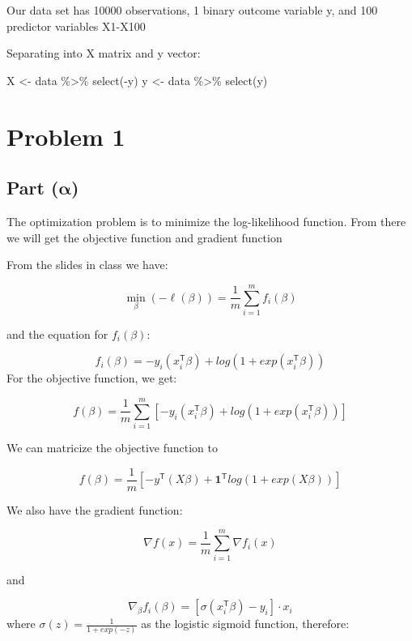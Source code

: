 \documentclass[
  letterpaper,
  DIV=11,
  numbers=noendperiod]{scrartcl}
\newenvironment{Shaded}{\begin{snugshade}}{\end{snugshade}}
\newcommand{\FunctionTok}[1]{\textcolor[rgb]{0.28,0.35,0.67}{#1}}
\newcommand{\NormalTok}[1]{\textcolor[rgb]{0.00,0.23,0.31}{#1}}
\newcommand{\OtherTok}[1]{\textcolor[rgb]{0.00,0.23,0.31}{#1}}
\newcommand{\SpecialCharTok}[1]{\textcolor[rgb]{0.37,0.37,0.37}{#1}}
\begin{document}
Our data set has 10000 observations, 1 binary outcome variable y, and
100 predictor variables X1-X100

Separating into X matrix and y vector:

\begin{Shaded}
\begin{Highlighting}[]
\NormalTok{X }\OtherTok{\textless{}{-}}\NormalTok{ data }\SpecialCharTok{\%\textgreater{}\%}
  \FunctionTok{select}\NormalTok{(}\SpecialCharTok{{-}}\NormalTok{y)}
\NormalTok{y }\OtherTok{\textless{}{-}}\NormalTok{ data }\SpecialCharTok{\%\textgreater{}\%}
  \FunctionTok{select}\NormalTok{(y)}
\end{Highlighting}
\end{Shaded}

\section{Problem 1}\label{problem-1}

\subsection{\texorpdfstring{Part
(\(\symbf{\alpha}\))}{Part (\textbackslash symbf\{\textbackslash alpha\})}}\label{part-symbfalpha}

The optimization problem is to minimize the log-likelihood function.
From there we will get the objective function and gradient function

From the slides in class we have:

\[
\min_{\beta} (-\ell(\beta)) = \frac{1}{m} \sum_{i=1}^{m} f_i(\beta)
\]

and the equation for \(f_i(\beta)\):

\[
f_i(\beta) = -y_i(x_i^{\mathsf{T}}\beta) + log(1 + exp(x_i^{\mathsf{T}} \beta))
\] For the objective function, we get:

\[
f(\beta) = \frac{1}{m} \sum_{i=1}^{m} [-y_i(x_i^{\mathsf{T}}\beta) + log(1 + exp(x_i^{\mathsf{T}} \beta))]
\]

We can matricize the objective function to

\[
\boxed{f(\beta) = \frac{1}{m}[-y^{\mathsf{T}}(X\beta) + \mathbf{1}^{\mathsf{T}}log(1 + exp(X\beta))]}
\]

We also have the gradient function:

\[
\nabla f(x) = \frac{1}{m} \sum_{i=1}^m \nabla f_i(x)
\]

and

\[
\nabla_\beta f_i(\beta) = [\sigma(x_i^{\mathsf{T}} \beta) - y_i] \cdot x_i
\] where \(\sigma(z) = \frac{1}{1+exp(-z)}\) as the logistic sigmoid
function, therefore:
\end{document}
